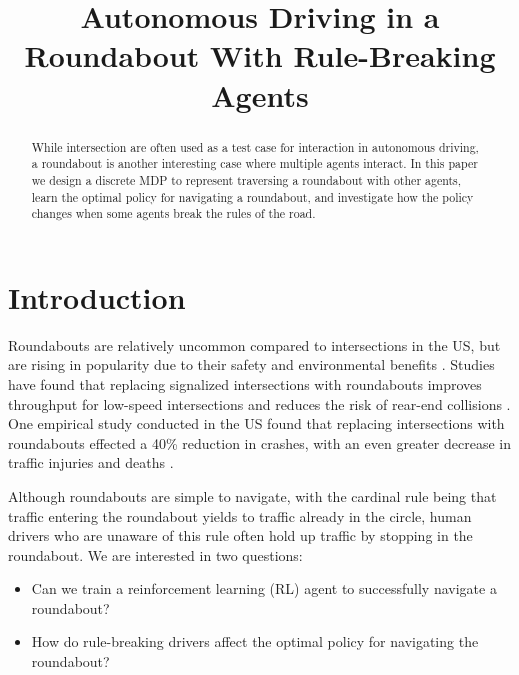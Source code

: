 \documentclass[conference]{IEEEtran}
\begin{document}
\title{Autonomous Driving in a Roundabout With Rule-Breaking Agents}

\author{
}

\maketitle

\begin{abstract}
While intersection are often used as a test case for interaction in autonomous driving, a roundabout is another interesting case where multiple agents interact. In this paper we design a discrete MDP to represent traversing a roundabout with other agents, learn the optimal policy for navigating a roundabout, and investigate how the policy changes when some agents break the rules of the road.
\end{abstract}


\section{Introduction}
Roundabouts are relatively uncommon compared to intersections in the US,
but are rising in popularity due to their safety and environmental benefits \cite{MANDAVILLI2008135}. Studies have found that replacing signalized intersections with roundabouts improves throughput for low-speed intersections and reduces the risk of rear-end collisions \cite{persaud2001safety, saccomanno2008comparing}. One empirical study conducted in the US found that replacing intersections with roundabouts effected a 40\% reduction in crashes, with an even greater decrease in traffic injuries and deaths \cite{persaud2001safety}.

Although roundabouts are simple to navigate, with the cardinal rule being that traffic entering the roundabout yields to traffic already in the circle, human drivers who are unaware of this rule often hold up traffic by stopping in the roundabout. We are interested in two questions:
\begin{itemize}
	\item Can we train a reinforcement learning (RL) agent to successfully navigate a roundabout?
	\item How do rule-breaking drivers affect the optimal policy for navigating the roundabout?
\end{itemize}
\end{document}
